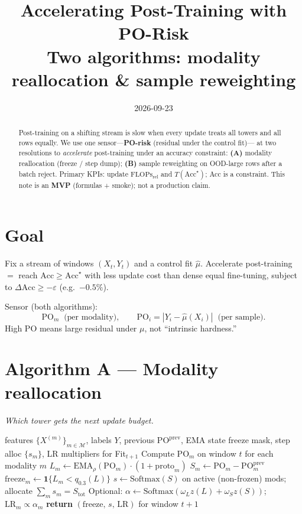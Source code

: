 \documentclass[11pt]{article}
\title{\textbf{Accelerating Post-Training with PO-Risk}\\[0.35em]
\large Two algorithms: modality reallocation \& sample reweighting}
\author{}
\date{2026-09-23}
\newcommand{\PO}{\mathrm{PO}}
\newcommand{\Acc}{\mathrm{Acc}}
\newcommand{\Flops}{\mathrm{FLOPs}_{\mathrm{rel}}}
\begin{document}
\maketitle

\begin{abstract}
Post-training on a shifting stream is slow when every update treats
all towers and all rows equally.
We use one sensor---\textbf{PO-risk} (residual under the control fit)---
at two resolutions to \emph{accelerate} post-training under an accuracy
constraint:
\textbf{(A)} modality reallocation (freeze / step dump);
\textbf{(B)} sample reweighting on OOD-large rows after a batch reject.
Primary KPIs: update $\Flops$ and $T(\Acc^\star)$; Acc is a constraint.
This note is an \textbf{MVP} (formulas + smoke); not a production claim.
\end{abstract}

\section{Goal}
Fix a stream of windows $(X_t,Y_t)$ and a control fit $\hat\mu$.
Accelerate post-training $=$ reach $\Acc\ge\Acc^\star$ with less update
cost than dense equal fine-tuning, subject to
$\Delta\Acc\ge-\varepsilon$ (e.g.\ $-0.5\%$).

Sensor (both algorithms):
\[
  \PO_m
  \;\;\text{(per modality)},
  \qquad
  \PO_i=|Y_i-\hat\mu(X_i)|
  \;\;\text{(per sample)}.
\]
High $\PO$ means large residual under $\mu$, not ``intrinsic hardness.''

\section{Algorithm A --- Modality reallocation}
\emph{Which tower gets the next update budget.}

\begin{algorithm}[H]
\caption{PO-modality post-train step (window $t\to t{+}1$)}
\label{alg:mod}
\begin{algorithmic}[1]
\Require features $\{X^{(m)}\}_{m\in\mathcal{M}}$, labels $Y$, previous $\PO^{\mathrm{prev}}$, EMA state
\Ensure freeze mask, step alloc $\{s_m\}$, LR multipliers for Fit$_{t+1}$
\State Compute $\PO_m$ on window $t$ for each modality $m$
\State $L_m \gets \mathrm{EMA}_\rho(\PO_m)\cdot(1+\mathrm{proto}_m)$
\State $S_m \gets \PO_m - \PO^{\mathrm{prev}}_m$
\State $\mathrm{freeze}_m \gets \mathbf{1}\{L_m < q_{0.3}(L)\}$
\State $s \gets \mathrm{Softmax}(S)$ on active (non-frozen) mods;
      allocate $\sum_m s_m = S_{\mathrm{tot}}$
\State Optional: $\alpha\gets\mathrm{Softmax}(\omega_L z(L)+\omega_S z(S))$;
      $\mathrm{LR}_m \propto \alpha_m$
\State \textbf{return} $(\mathrm{freeze},\,s,\,\mathrm{LR})$ for window $t{+}1$
\end{algorithmic}
\end{algorithm}
\end{document}
